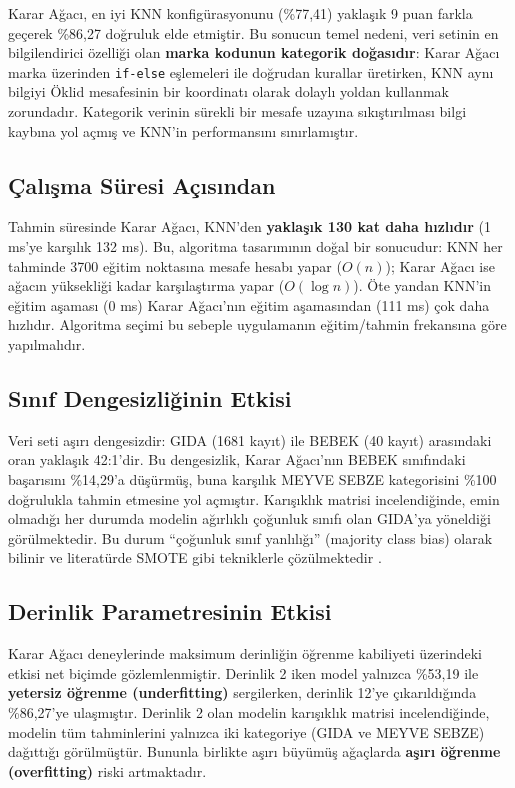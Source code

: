 \documentclass[conference]{IEEEtran}
\begin{document}
Karar Ağacı, en iyi KNN konfigürasyonunu (\%77,41) yaklaşık 9 puan farkla geçerek \%86,27 doğruluk elde etmiştir. Bu sonucun temel nedeni, veri setinin en bilgilendirici özelliği olan \textbf{marka kodunun kategorik doğasıdır}: Karar Ağacı marka üzerinden \texttt{if-else} eşlemeleri ile doğrudan kurallar üretirken, KNN aynı bilgiyi Öklid mesafesinin bir koordinatı olarak dolaylı yoldan kullanmak zorundadır. Kategorik verinin sürekli bir mesafe uzayına sıkıştırılması bilgi kaybına yol açmış ve KNN'in performansını sınırlamıştır.

\subsection{Çalışma Süresi Açısından}

Tahmin süresinde Karar Ağacı, KNN'den \textbf{yaklaşık 130 kat daha hızlıdır} (1 ms'ye karşılık 132 ms). Bu, algoritma tasarımının doğal bir sonucudur: KNN her tahminde 3700 eğitim noktasına mesafe hesabı yapar ($O(n)$); Karar Ağacı ise ağacın yüksekliği kadar karşılaştırma yapar ($O(\log n)$). Öte yandan KNN'in eğitim aşaması (0 ms) Karar Ağacı'nın eğitim aşamasından (111 ms) çok daha hızlıdır. Algoritma seçimi bu sebeple uygulamanın eğitim/tahmin frekansına göre yapılmalıdır.

\subsection{Sınıf Dengesizliğinin Etkisi}

Veri seti aşırı dengesizdir: GIDA (1681 kayıt) ile BEBEK (40 kayıt) arasındaki oran yaklaşık 42:1'dir. Bu dengesizlik, Karar Ağacı'nın BEBEK sınıfındaki başarısını \%14,29'a düşürmüş, buna karşılık MEYVE SEBZE kategorisini \%100 doğrulukla tahmin etmesine yol açmıştır. Karışıklık matrisi incelendiğinde, emin olmadığı her durumda modelin ağırlıklı çoğunluk sınıfı olan GIDA'ya yöneldiği görülmektedir. Bu durum ``çoğunluk sınıf yanlılığı'' (majority class bias) olarak bilinir ve literatürde SMOTE gibi tekniklerle çözülmektedir \cite{chawla}.

\subsection{Derinlik Parametresinin Etkisi}

Karar Ağacı deneylerinde maksimum derinliğin öğrenme kabiliyeti üzerindeki etkisi net biçimde gözlemlenmiştir. Derinlik 2 iken model yalnızca \%53,19 ile \textbf{yetersiz öğrenme (underfitting)} sergilerken, derinlik 12'ye çıkarıldığında \%86,27'ye ulaşmıştır. Derinlik 2 olan modelin karışıklık matrisi incelendiğinde, modelin tüm tahminlerini yalnızca iki kategoriye (GIDA ve MEYVE SEBZE) dağıttığı görülmüştür. Bununla birlikte aşırı büyümüş ağaçlarda \textbf{aşırı öğrenme (overfitting)} riski artmaktadır.
\end{document}
